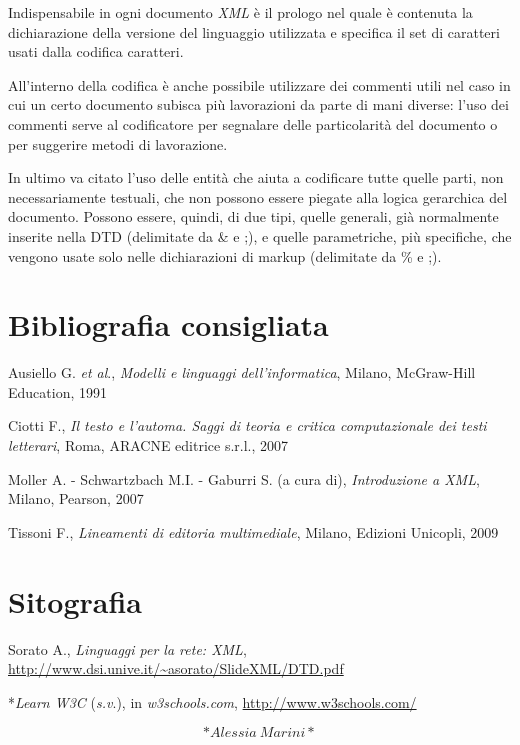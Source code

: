 \documentclass[
  b5paper,
  twoside,
  12pt,
  chapterprefix=false,
  bibliography=totocnumbered,
  parskip=false]{scrbook}
\begin{document}
Indispensabile in ogni documento \emph{XML} è il prologo nel quale è
contenuta la dichiarazione della versione del linguaggio utilizzata e
specifica il set di caratteri usati dalla codifica caratteri.

All'interno della codifica è anche possibile utilizzare dei commenti
utili nel caso in cui un certo documento subisca più lavorazioni da
parte di mani diverse: l'uso dei commenti serve al codificatore per
segnalare delle particolarità del documento o per suggerire metodi di
lavorazione.

In ultimo va citato l'uso delle entità che aiuta a codificare tutte
quelle parti, non necessariamente testuali, che non possono essere
piegate alla logica gerarchica del documento. Possono essere, quindi, di
due tipi, quelle generali, già normalmente inserite nella DTD
(delimitate da \& e ;), e quelle parametriche, più specifiche, che
vengono usate solo nelle dichiarazioni di markup (delimitate da \% e ;).

\hypertarget{bibliografia-consigliata-28}{%
\section*{Bibliografia consigliata}\label{bibliografia-consigliata-28}}

Ausiello G. \emph{et al}., \emph{Modelli e linguaggi dell'informatica}, Milano,
McGraw-Hill Education, 1991

Ciotti F., \emph{Il testo e l'automa. Saggi di teoria e critica
computazionale dei testi letterari}, Roma, ARACNE editrice s.r.l., 2007

Moller A. - Schwartzbach M.I. - Gaburri S. (a cura di), \emph{Introduzione a
XML}, Milano, Pearson, 2007

Tissoni F., \emph{Lineamenti di editoria multimediale}, Milano, Edizioni
Unicopli, 2009

\hypertarget{sitografia-35}{%
\section*{Sitografia}\label{sitografia-35}}

Sorato A., \emph{Linguaggi per la rete: XML},
\url{http://www.dsi.unive.it/~asorato/SlideXML/DTD.pdf}

*\emph{Learn W3C} (\emph{s.v}.), in \emph{w3schools.com},
\url{http://www.w3schools.com/}

\[*Alessia~Marini*\]

\backmatter
\end{document}
